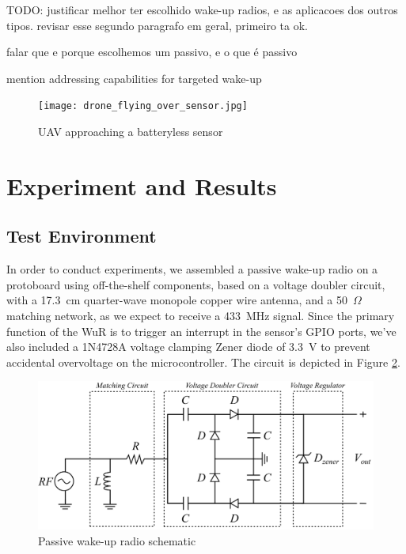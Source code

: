\documentclass[conference]{IEEEtran}
\begin{document}
TODO: justificar melhor ter escolhido wake-up radios, e as aplicacoes dos outros tipos. revisar esse segundo paragrafo em geral, primeiro ta ok.

falar que e porque escolhemos um passivo, e o que é passivo

mention addressing capabilities for targeted wake-up

\begin{figure}[htbp]
  \centerline{\texttt{[image: drone\_flying\_over\_sensor.jpg]}}
  \caption{UAV approaching a batteryless sensor}
  \label{fig:drone_over_sensor}
\end{figure}

\section{Experiment and Results}

\subsection{Test Environment}

In order to conduct experiments, we assembled a passive wake-up radio on a protoboard using off-the-shelf components, based on a voltage doubler circuit, with a 17.3~cm quarter-wave monopole copper wire antenna, and a 50~$\Omega$ matching network, as we expect to receive a 433~MHz signal. Since the primary function of the WuR is to trigger an interrupt in the sensor's GPIO ports, we've also included a 1N4728A voltage clamping Zener diode of 3.3~V to prevent accidental overvoltage on the microcontroller. The circuit is depicted in Figure \ref{fig:receiver}.

\begin{figure}[htbp]
  \centerline{\includegraphics[width=1\linewidth]{receiver.png}}
  \caption{Passive wake-up radio schematic}
  \label{fig:receiver}
\end{figure}
\end{document}
